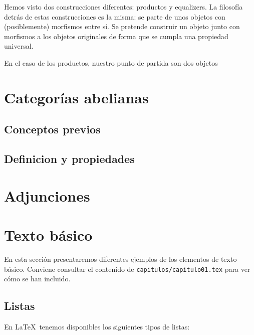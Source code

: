 Hemos visto dos construcciones diferentes: productos y equalizers. La filosofía detrás de estas construcciones es la misma: se parte de unos objetos con (posiblemente) morfismos entre sí. Se pretende construir un objeto junto con morfismos a los objetos originales de forma que se cumpla una propiedad universal.  

En el caso de los productos, nuestro punto de partida son dos objetos 


\begin{definicion}
    
\end{definicion}

\section{Categorías abelianas}

\subsection{Conceptos previos}

\subsection{Definicion y propiedades}

\section{Adjunciones}

\section{Texto básico}

En esta sección presentaremos diferentes ejemplos de los elementos de texto básico. Conviene consultar el contenido de \texttt{capitulos/capitulo01.tex} para ver cómo se han incluido.

\subsection{Listas}
En \LaTeX\ tenemos disponibles los siguientes tipos de listas:

